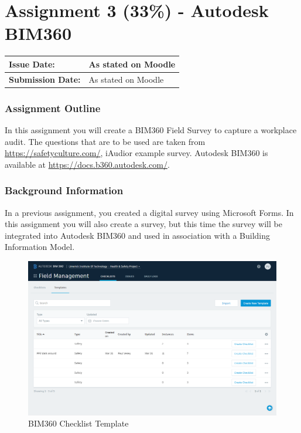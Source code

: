 
	
\part*{Assignment 3 (33\%) - Autodesk BIM360}

\begin{tabularx}{\textwidth}{ |X|X| }
	\hline
	\textbf{Issue Date:} & As stated on Moodle \\
	\hline 
	\textbf{Submission Date:}  & As stated on Moodle  \\
	\hline
\end{tabularx}


\section*{Assignment Outline}


In this assignment you will create a BIM360 Field Survey to capture a workplace audit.  The questions that are to be used are taken from \href{https://safetyculture.com/}{https://safetyculture.com/}, iAudior example survey.   Autodesk BIM360 is available at \href{https://docs.b360.autodesk.com/}{https://docs.b360.autodesk.com/}.


\section*{Background Information}

In a previous assignment, you created a digital survey using Microsoft Forms.  In this assignment you will also create a survey, but this time the survey will be integrated into Autodesk BIM360 and used in association with a Building Information Model.


\begin{figure}
	\centering
	\includegraphics[width=1.0\linewidth]{./img/Template.png}
	\caption{BIM360 Checklist Template}
	\label{fig:BIM369ChecklistTemplate}
\end{figure}


